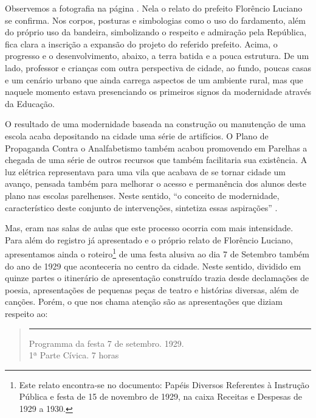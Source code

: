 \begin{refsection}
Observemos a fotografia na página \pageref{fig:turmaProfessor}. Nela o relato do prefeito Florêncio Luciano se confirma. Nos corpos, posturas e simbologias como o uso do fardamento, além do próprio uso da bandeira, simbolizando o respeito e admiração pela República, fica clara a inscrição a expansão do projeto do referido prefeito. Acima, o progresso e o desenvolvimento, abaixo, a terra batida e a pouca estrutura. De um lado, professor e crianças com outra perspectiva de cidade, ao fundo, poucas casas e um cenário urbano que ainda carrega aspectos de um ambiente rural, mas que naquele momento estava presenciando os primeiros signos da modernidade através da Educação.  

O resultado de uma modernidade baseada na construção ou manutenção de uma escola acaba depositando na cidade uma série de artifícios. O Plano de Propaganda Contra o Analfabetismo também acabou promovendo em Parelhas a chegada de uma série de outros recursos que também facilitaria sua existência. A luz elétrica representava para uma vila que acabava de se tornar cidade um avanço, pensada também para melhorar o acesso e permanência dos alunos deste plano nas escolas parelhenses. Neste sentido, ``o conceito de modernidade, característico deste conjunto de intervenções, sintetiza essas aspirações'' \cite[p.~68]{Dias2012Laranjas}.

Mas, eram nas salas de aulas que este processo ocorria com mais intensidade. Para além do registro já apresentado e o próprio relato de Florêncio Luciano, apresentamos ainda o roteiro\footnote{Este relato encontra-se no documento: Papéis Diversos Referentes à Instrução Pública e festa de 15 de novembro de 1929, na caixa Receitas e Despesas de 1929 a 1930.} de uma festa alusiva ao dia 7 de Setembro também do ano de 1929 que aconteceria no centro da cidade. Neste sentido, dividido em quinze partes o itinerário de apresentação construído trazia desde declamações de poesia, apresentações de pequenas peças de teatro e histórias diversas, além de canções. Porém, o que nos chama atenção são as apresentações que diziam respeito ao:

\begin{quotation}
    \noindent\rule{.87\textwidth}{0.4pt}
    
    \begin{center}
                    Programma da festa 7 de setembro. 1929. \\
                         1ª Parte Cívica. 7 horas
    \end{center}


\end{quotation}
\end{refsection}
